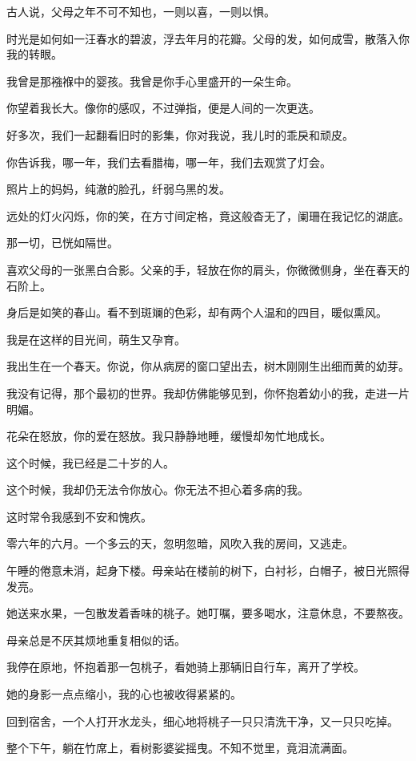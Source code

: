 \documentclass[12pt,a4paper]{article}
\def\blankrev{\vspace{1ex}}									%
\begin{document}
		\blankrev
		古人说，父母之年不可不知也，一则以喜，一则以惧。\par
		时光是如何如一汪春水的碧波，浮去年月的花瓣。父母的发，如何成雪，散落入你我的转眼。\par
		我曾是那襁褓中的婴孩。我曾是你手心里盛开的一朵生命。\par
		你望着我长大。像你的感叹，不过弹指，便是人间的一次更迭。\par
		好多次，我们一起翻看旧时的影集，你对我说，我儿时的乖戾和顽皮。\par
		你告诉我，哪一年，我们去看腊梅，哪一年，我们去观赏了灯会。\par
		照片上的妈妈，纯澈的脸孔，纤弱乌黑的发。\par
		远处的灯火闪烁，你的笑，在方寸间定格，竟这般杳无了，阑珊在我记忆的湖底。\par
		那一切，已恍如隔世。\par
		喜欢父母的一张黑白合影。父亲的手，轻放在你的肩头，你微微侧身，坐在春天的石阶上。\par
		身后是如笑的春山。看不到斑斓的色彩，却有两个人温和的四目，暖似熏风。\par
		我是在这样的目光间，萌生又孕育。\par
		我出生在一个春天。你说，你从病房的窗口望出去，树木刚刚生出细而黄的幼芽。\par
		我没有记得，那个最初的世界。我却仿佛能够见到，你怀抱着幼小的我，走进一片明媚。\par
		花朵在怒放，你的爱在怒放。我只静静地睡，缓慢却匆忙地成长。

		\blankrev
		这个时候，我已经是二十岁的人。\par
		这个时候，我却仍无法令你放心。你无法不担心着多病的我。\par
		这时常令我感到不安和愧疚。

		\blankrev
		零六年的六月。一个多云的天，忽明忽暗，风吹入我的房间，又逃走。\par
		午睡的倦意未消，起身下楼。母亲站在楼前的树下，白衬衫，白帽子，被日光照得发亮。\par
		她送来水果，一包散发着香味的桃子。她叮嘱，要多喝水，注意休息，不要熬夜。\par
		母亲总是不厌其烦地重复相似的话。\par
		我停在原地，怀抱着那一包桃子，看她骑上那辆旧自行车，离开了学校。\par
		她的身影一点点缩小，我的心也被收得紧紧的。\par
		回到宿舍，一个人打开水龙头，细心地将桃子一只只清洗干净，又一只只吃掉。\par
		整个下午，躺在竹席上，看树影婆娑摇曳。不知不觉里，竟泪流满面。
\end{document}

